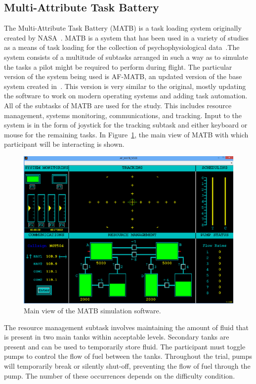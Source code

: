 \documentclass[11pt]{article}
\begin{document}
\subsection{Multi-Attribute Task Battery}
The Multi-Attribute Task Battery (MATB) is a task loading system originally created by NASA~\cite{Comstock}. MATB is a system that has been used in a variety of studies as a means of task loading for the collection of psychophysiological data~\cite{Wilson, Smith, Wang_Z}.The system consists of a multitude of subtasks arranged in such a way as to simulate the tasks a pilot might be required to perform during flight. The particular version of the system being used is AF-MATB, an updated version of the base system created in~\cite{Estepp}. This version is very similar to the original, mostly updating the software to work on modern operating systems and adding task automation. All of the subtasks of MATB are used for the study. This includes resource management, systems monitoring, communications, and tracking. Input to the system is in the form of joystick for the tracking subtask and either keyboard or mouse for the remaining tasks. In Figure~\ref{fig:matb}, the main view of MATB with which participant will be interacting is shown.

\begin{figure}[p]
    \centering
    \includegraphics[width=\linewidth]{figures/matb.png}
    \caption{Main view of the MATB simulation software. }
    \label{fig:matb}
\end{figure}

The resource management subtask involves maintaining the amount of fluid that is present in two main tanks within acceptable levels. Secondary tanks are present and can be used to temporarily store fluid. The participant must toggle pumps to control the flow of fuel between the tanks. Throughout the trial, pumps will temporarily break or silently shut-off, preventing the flow of fuel through the pump. The number of these occurrences depends on the difficulty condition.
\end{document}
